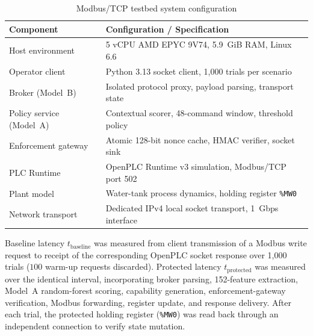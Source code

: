 \documentclass[journal]{IEEEtran}
\renewcommand{\arraystretch}{1.08}
\newcommand{\modelb}{Model~B}
\newcommand{\modela}{Model~A}
\begin{document}
\begin{table}[t]
\centering
\caption{Modbus/TCP testbed system configuration}
\label{tab:hil_config}
\renewcommand{\arraystretch}{1.12}
\begin{tabularx}{\columnwidth}{@{}lX@{}}
\toprule
\textbf{Component} & \textbf{Configuration / Specification} \\
\midrule
Host environment & 5 vCPU AMD EPYC 9V74, 5.9~GiB RAM, Linux 6.6 \\
Operator client & Python 3.13 socket client, 1,000 trials per scenario \\
Broker (\modelb{}) & Isolated protocol proxy, payload parsing, transport state \\
Policy service (\modela{}) & Contextual scorer, 48-command window, threshold policy \\
Enforcement gateway & Atomic 128-bit nonce cache, HMAC verifier, socket sink \\
PLC Runtime & OpenPLC Runtime v3 simulation, Modbus/TCP port 502 \\
Plant model & Water-tank process dynamics, holding register \texttt{\%MW0} \\
Network transport & Dedicated IPv4 local socket transport, 1~Gbps interface \\
\bottomrule
\end{tabularx}
\end{table}

Baseline latency $t_{\mathrm{baseline}}$ was measured from client transmission of a Modbus write request to receipt of the corresponding OpenPLC socket response over 1,000 trials ($100$ warm-up requests discarded). Protected latency $t_{\mathrm{protected}}$ was measured over the identical interval, incorporating broker parsing, 152-feature extraction, \modela{} random-forest scoring, capability generation, enforcement-gateway verification, Modbus forwarding, register update, and response delivery. After each trial, the protected holding register (\texttt{\%MW0}) was read back through an independent connection to verify state mutation.
\end{document}
